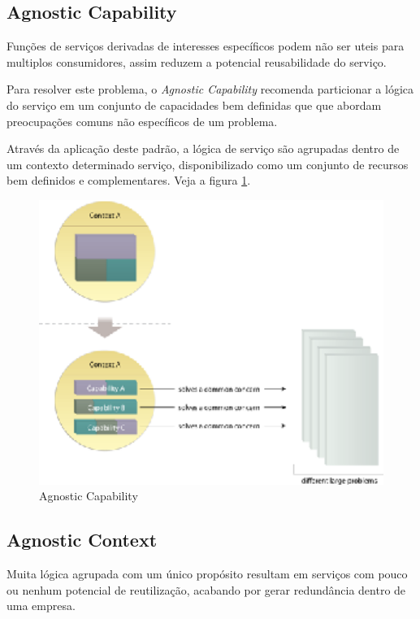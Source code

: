 \documentclass[12pt]{article}
\begin{document}
\subsection{Agnostic Capability}

Funções de serviços derivadas de interesses específicos podem não ser uteis para multiplos consumidores, assim reduzem a potencial reusabilidade do serviço.

Para resolver este problema, o \textit{Agnostic Capability} recomenda particionar a lógica do serviço em um conjunto de capacidades bem definidas que que abordam preocupações comuns não específicos de um problema.

Através da aplicação deste padrão, a lógica de serviço são agrupadas dentro de um contexto determinado serviço, disponibilizado como um conjunto de recursos bem definidos e complementares. Veja a figura \ref{fig:1}.

\begin{figure}[H]
\centering
\includegraphics[width=14cm]{img/fig1.eps}
\caption{Agnostic Capability}
\label{fig:1}
\end{figure}

\subsection{Agnostic Context}

Muita lógica agrupada com um único propósito resultam em serviços com pouco ou nenhum potencial de reutilização, acabando por gerar redundância dentro de uma empresa.
\end{document}
